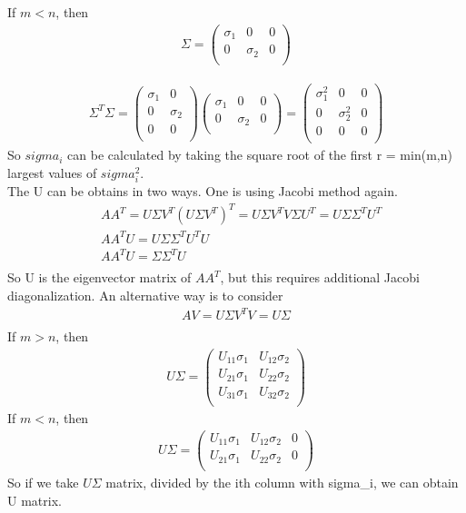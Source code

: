 \documentclass[a4paper]{article}
\begin{document}
If $m < n $, then\\
\begin{align*}
	\Sigma = \left(  \begin{array} {ccc }
		\sigma_1 & 0 & 0\\
		0 & \sigma_2 & 0\\
	\end{array} \right)
\end{align*}

\begin{align*}
	\Sigma^T \Sigma = \left(  \begin{array} {cc}
		\sigma_1 & 0  \\
		0 & \sigma_2 \\
		0 & 0\\
	\end{array} \right)
	\left(  \begin{array} {ccc}
		\sigma_1 & 0 & 0\\
		0 & \sigma_2 & 0\\
	\end{array} \right)
	= \left(  \begin{array} {ccc}
		\sigma_1^2 & 0 & 0\\
		0 & \sigma_2^2 & 0\\
		0 & 0 & 0\\
	\end{array} \right)
\end{align*}
So $sigma_i$ can be calculated by taking the square root of the first r = min(m,n) largest values of $sigma_i^2$.\\
The U can be obtains in two ways. One is using Jacobi method again.
\begin{align*}
	& A A^T =  U \Sigma V^T (U \Sigma V^T)^T = U \Sigma V^T V \Sigma U^T = U \Sigma \Sigma^T U^T \\
	& A A^T U =  U \Sigma \Sigma^T U^T U \\
	& A A^T U =  \Sigma \Sigma^T U \\
\end{align*}
So U is the eigenvector matrix of $A A^T$, but this requires additional Jacobi diagonalization. An alternative way is to consider\\
\begin{align*}
	AV = U \Sigma V^T V = U \Sigma\\
\end{align*}
If $m > n $, then\\
\begin{align*}
	U\Sigma = \left(  \begin{array} {cc}
		U_{11}\sigma_1 & U_{12}\sigma_2 \\
		U_{21}\sigma_1 & U_{22}\sigma_2 \\
		U_{31}\sigma_1 & U_{32}\sigma_2 \\
	\end{array} \right)
\end{align*}	
If $m < n $, then\\
\begin{align*}
	U\Sigma = \left(  \begin{array} {ccc}
		U_{11}\sigma_1 & U_{12}\sigma_2 & 0\\
		U_{21}\sigma_1 & U_{22}\sigma_2 & 0\\
	\end{array} \right)
\end{align*}
So if we take $U\Sigma$ matrix, divided by the ith column with sigma_i, we can obtain U matrix.\\
\end{document}
